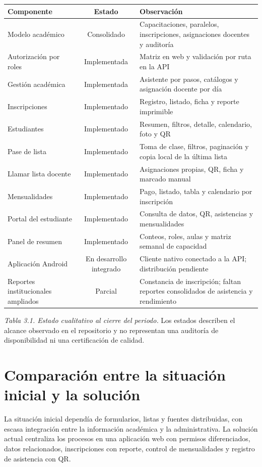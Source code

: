 \documentclass[12pt,a4paper,oneside]{report}
\begin{document}
\renewcommand{\arraystretch}{1.25}
\begin{longtable}{@{}p{} c p{}@{}}
  \toprule
  \textbf{Componente} & \textbf{Estado} & \textbf{Observación} \\
  \midrule
  \endhead
  Modelo académico & Consolidado & Capacitaciones, paralelos, inscripciones, asignaciones docentes y auditoría \\
  Autorización por roles & Implementada & Matriz en web y validación por ruta en la API \\
  Gestión académica & Implementada & Asistente por pasos, catálogos y asignación docente por día \\
  Inscripciones & Implementado & Registro, listado, ficha y reporte imprimible \\
  Estudiantes & Implementado & Resumen, filtros, detalle, calendario, foto y QR \\
  Pase de lista & Implementado & Toma de clase, filtros, paginación y copia local de la última lista \\
  Llamar lista docente & Implementado & Asignaciones propias, QR, ficha y marcado manual \\
  Mensualidades & Implementado & Pago, listado, tabla y calendario por inscripción \\
  Portal del estudiante & Implementado & Consulta de datos, QR, asistencias y mensualidades \\
  Panel de resumen & Implementado & Conteos, roles, aulas y matriz semanal de capacidad \\
  Aplicación Android & En desarrollo integrado & Cliente nativo conectado a la API; distribución pendiente \\
  Reportes institucionales ampliados & Parcial & Constancia de inscripción; faltan reportes consolidados de asistencia y rendimiento \\
  \bottomrule
\end{longtable}

\emph{Tabla 3.1. Estado cualitativo al cierre del periodo.} Los estados describen el alcance observado en el repositorio y no representan una auditoría de disponibilidad ni una certificación de calidad.

\section{Comparación entre la situación inicial y la solución}

La situación inicial dependía de formularios, listas y fuentes distribuidas, con escasa integración entre la información académica y la administrativa. La solución actual centraliza los procesos en una aplicación web con permisos diferenciados, datos relacionados, inscripciones con reporte, control de mensualidades y registro de asistencia con QR.
\end{document}
